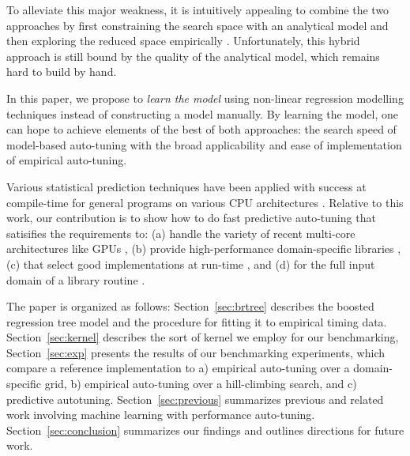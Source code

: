 \documentclass{sig-alternate}
\begin{document}

To alleviate this major weakness, it is intuitively appealing to combine the two
approaches by first constraining the search space with an analytical model and
then exploring the reduced space empirically \citep{chen2005combining,
li2009note}. Unfortunately, this hybrid approach is still bound by the quality
of the analytical model, which remains hard to build by hand.


In this paper, we propose to \emph{learn the model} using non-linear regression
modelling techniques instead of constructing a model manually. By learning the model, one can
hope to achieve elements of the best of both approaches: the search speed of model-based auto-tuning with the broad applicability
and ease of implementation of empirical auto-tuning.

Various statistical prediction techniques have been applied with
success at compile-time for general programs on various CPU architectures
\citep{monsifrot2002machine, stephenson2003meta, yotov2003comparison,
kulkarni2004fast, cooper2005acme, franke2005probabilistic,
hutter2006performance, cavazos2007rapidly, cavazos2008intelligent,
hartono2009annotation, park2011evaluation, fursin2008milepost}.
Relative to this work, our contribution is to show
how to do fast predictive auto-tuning that satisifies the requirements to:
(a) handle the variety of recent multi-core architectures like GPUs \citep{schaa2009exploring},
(b) provide high-performance domain-specific libraries \citep{nukada2009auto, li2009note, kamil2010auto},
(c) that select good implementations at run-time \citep{klockner2011pycuda, pinto+cox:2011gcg}, and
(d) for the full input domain of a library routine \citep{liu2009cross, grauer2011optimizing}.

The paper is organized as follows:
Section~\ref{sec:brtree} describes the boosted regression tree model and the procedure for fitting it to empirical timing data.
Section~\ref{sec:kernel} describes the sort of kernel we employ for our benchmarking,
Section~\ref{sec:exp} presents the results of our benchmarking experiments, which
compare a reference implementation to a) empirical auto-tuning over a domain-specific grid,
b) empirical auto-tuning over a hill-climbing search, and
c) predictive autotuning.
Section~\ref{sec:previous} summarizes previous and related work involving  machine learning with performance auto-tuning.
Section~\ref{sec:conclusion} summarizes our findings and outlines directions for future work.
\end{document}
